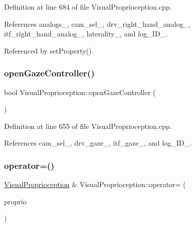 Definition at line 684 of file Visual\+Proprioception.\+cpp.



References analogs\+\_\+, cam\+\_\+sel\+\_\+, drv\+\_\+right\+\_\+hand\+\_\+analog\+\_\+, itf\+\_\+right\+\_\+hand\+\_\+analog\+\_\+, laterality\+\_\+, and log\+\_\+\+I\+D\+\_\+.



Referenced by set\+Property().

\mbox{\label{classVisualProprioception_aaa7b46247c25b4e69a389b82472caadf}} 
\subsubsection{\texorpdfstring{open\+Gaze\+Controller()}{openGazeController()}}
{\footnotesize\ttfamily bool Visual\+Proprioception\+::open\+Gaze\+Controller (\begin{DoxyParamCaption}{ }\end{DoxyParamCaption})\hspace{0.3cm}{\ttfamily [protected]}}



Definition at line 655 of file Visual\+Proprioception.\+cpp.



References cam\+\_\+sel\+\_\+, drv\+\_\+gaze\+\_\+, itf\+\_\+gaze\+\_\+, and log\+\_\+\+I\+D\+\_\+.

\mbox{\label{classVisualProprioception_a86f418db34161e128fabf2572ef4e880}} 
\subsubsection{\texorpdfstring{operator=()}{operator=()}\hspace{0.1cm}{\footnotesize\ttfamily [1/2]}}
{\footnotesize\ttfamily \hyperlink{classVisualProprioception}{Visual\+Proprioception} \& Visual\+Proprioception\+::operator= (\begin{DoxyParamCaption}\item[{const \hyperlink{classVisualProprioception}{Visual\+Proprioception} \&}]{proprio }\end{DoxyParamCaption})}




